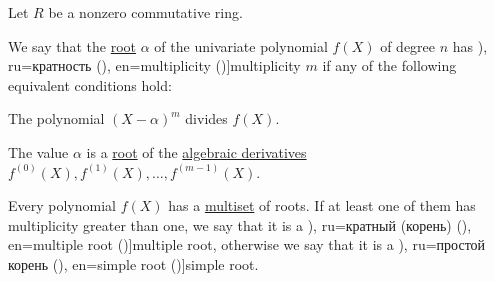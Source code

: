 \begin{definition}\label{def:polynomial_root_multiplicity}\mimprovised
  Let \( R \) be a nonzero commutative ring.

  We say that the \hyperref[def:polynomial_root]{root} \( \alpha \) of the univariate polynomial \( f(X) \) of degree \( n \) has \term[bg=кратност (\cite[171]{Обрешков1962ВисшаАлгебра}), ru=кратность (\cite[163]{Тыртышников2017ОсновыАлгебры}), en=multiplicity (\cite[229]{Jacobson1985BasicAlgebraI})]{multiplicity} \( m \) if any of the following equivalent conditions hold:
  \begin{thmenum}
     The polynomial \( (X - \alpha)^m \) divides \( f(X) \).

     The value \( \alpha \) is a \hyperref[def:polynomial_root]{root} of the \hyperref[def:algebraic_derivative]{algebraic derivatives} \( f^{(0)}(X), f^{(1)}(X), \ldots, f^{(m-1)}(X) \).
  \end{thmenum}

  Every polynomial \( f(X) \) has a \hyperref[def:multiset]{multiset} of roots. If at least one of them has multiplicity greater than one, we say that it is a \term[bg=многократен (корен) (\cite[171]{Обрешков1962ВисшаАлгебра}), ru=кратный (корень) (\cite[163]{Тыртышников2017ОсновыАлгебры}), en=multiple root (\cite[229]{Jacobson1985BasicAlgebraI})]{multiple root}, otherwise we say that it is a \term[bg=прост корен (\cite[171]{Обрешков1962ВисшаАлгебра}), ru=простой корень (\cite[163]{Тыртышников2017ОсновыАлгебры}), en=simple root (\cite[229]{Jacobson1985BasicAlgebraI})]{simple root}.
\end{definition}
